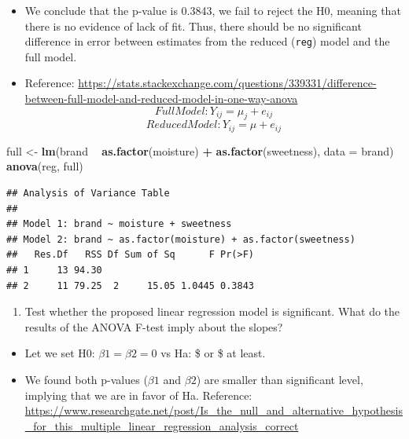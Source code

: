 \documentclass[
]{article}
\newenvironment{Shaded}{\begin{snugshade}}{\end{snugshade}}
\newcommand{\DataTypeTok}[1]{\textcolor[rgb]{0.13,0.29,0.53}{#1}}
\newcommand{\KeywordTok}[1]{\textcolor[rgb]{0.13,0.29,0.53}{\textbf{#1}}}
\newcommand{\NormalTok}[1]{#1}
\newcommand{\OperatorTok}[1]{\textcolor[rgb]{0.81,0.36,0.00}{\textbf{#1}}}
\newcommand{\StringTok}[1]{\textcolor[rgb]{0.31,0.60,0.02}{#1}}
\providecommand{\tightlist}{%
  \setlength{\itemsep}{0pt}\setlength{\parskip}{0pt}}
\begin{document}
\begin{itemize}
\tightlist
\item
  We conclude that the p-value is 0.3843, we fail to reject the H0,
  meaning that there is no evidence of lack of fit. Thus, there should
  be no significant difference in error between estimates from the
  reduced (\texttt{reg}) model and the full model.
\item
  Reference:
  \url{https://stats.stackexchange.com/questions/339331/difference-between-full-model-and-reduced-model-in-one-way-anova}
  \[
  Full Model: Y_{ij} = \mu_j + e_{ij}
  \] \[
  Reduced Model: Y_{ij} = \mu + e_{ij}
  \]
\end{itemize}

\begin{Shaded}
\begin{Highlighting}[]
\NormalTok{full <-}\StringTok{ }\KeywordTok{lm}\NormalTok{(brand }\OperatorTok{~}\StringTok{ }\KeywordTok{as.factor}\NormalTok{(moisture) }\OperatorTok{+}\StringTok{ }\KeywordTok{as.factor}\NormalTok{(sweetness), }\DataTypeTok{data =}\NormalTok{ brand)}
\KeywordTok{anova}\NormalTok{(reg, full)}
\end{Highlighting}
\end{Shaded}

\begin{verbatim}
## Analysis of Variance Table
## 
## Model 1: brand ~ moisture + sweetness
## Model 2: brand ~ as.factor(moisture) + as.factor(sweetness)
##   Res.Df   RSS Df Sum of Sq      F Pr(>F)
## 1     13 94.30                           
## 2     11 79.25  2     15.05 1.0445 0.3843
\end{verbatim}

\begin{enumerate}
\def\labelenumi{(\alph{enumi})}
\setcounter{enumi}{4}
\tightlist
\item
  Test whether the proposed linear regression model is significant. What
  do the results of the ANOVA F-test imply about the slopes?
\end{enumerate}

\begin{itemize}
\tightlist
\item
  Let we set H0: \(\beta1 = \beta2 = 0\) vs Ha: \$  or 
   \$ at least.
\item
  We found both p-values (\(\beta1\) and \(\beta2\)) are smaller than
  significant level, implying that we are in favor of Ha. Reference:
  \url{https://www.researchgate.net/post/Is_the_null_and_alternative_hypothesis_for_this_multiple_linear_regression_analysis_correct}
\end{itemize}
\end{document}
